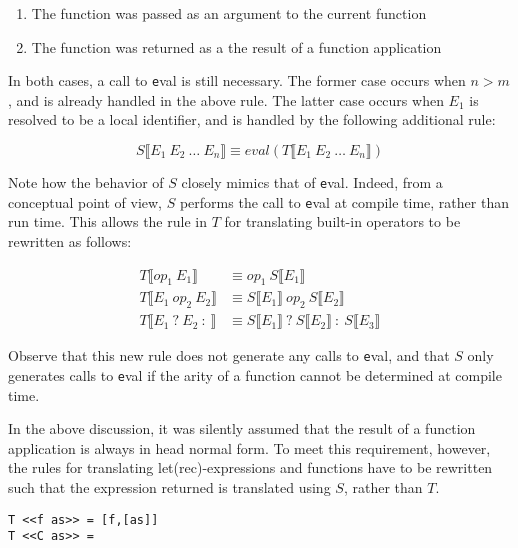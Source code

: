 \begin{enumerate}
\item The function was passed as an argument to the current function
\item The function was returned as a the result of a function application
\end{enumerate}

In both cases, a call to {\texttt eval} is still necessary. The former case
occurs when $n > m$, and is already handled in the above rule. The latter case
occurs when $E_1$ is resolved to be a local identifier, and is handled by the
following additional rule:

\[ S \llbracket E_1 \: E_2 \: \ldots \: E_n \rrbracket \equiv
   eval(T \llbracket E_1 \: E_2 \: \ldots \: E_n \rrbracket) \]

Note how the behavior of $S$ closely mimics that of {\texttt eval}. Indeed,
from a conceptual point of view, $S$ performs the call to {\texttt eval} at
compile time, rather than run time. This allows the rule in $T$ for translating
built-in operators to be rewritten as follows:

\begin{align*}
T \llbracket op_1 \: E_1 \rrbracket &
        \equiv op_1 \: S \llbracket E_1 \rrbracket \\
T \llbracket E_1 \: op_2 \: E_2 \rrbracket &
        \equiv S \llbracket E_1 \rrbracket \: op_2 \:
               S \llbracket E_2 \rrbracket \\
T \llbracket E_1 \: ? \: E_2 \: : \: \rrbracket &
        \equiv S \llbracket E_1 \rrbracket \: ? \:
               S \llbracket E_2 \rrbracket \: : \:
               S \llbracket E_3 \rrbracket 
\end{align*}

Observe that this new rule does not generate any calls to {\texttt eval}, and
that $S$ only generates calls to {\texttt eval} if the arity of a function
cannot be determined at compile time.

In the above discussion, it was silently assumed that the result of a function
application is always in head normal form. To meet this requirement, however,
the rules for translating let(rec)-expressions and functions have to be
rewritten such that the expression returned is translated using $S$, rather than
$T$.

\begin{verbatim}
T <<f as>> = [f,[as]]
T <<C as>> = 
\end{verbatim}
